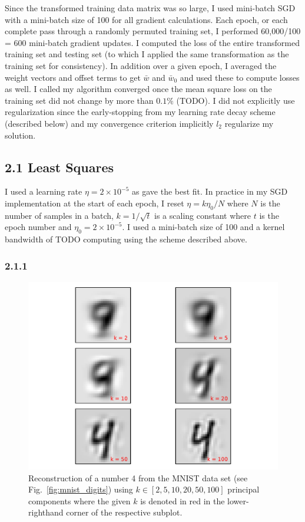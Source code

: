 \documentclass[12pt]{amsart}
\begin{document}
Since the transformed training data matrix was so large, I used mini-batch SGD with a mini-batch size of 100 for all gradient calculations.  Each epoch, or each complete pass through a randomly permuted training set, I performed 60,000/100 = 600 mini-batch gradient updates.  I computed the loss of the entire transformed training set and testing set (to which I applied the same transformation as the training set for consistency).  In addition over a given epoch, I averaged the weight vectors and offset terms to get $\bar{w}$ and $\bar{w}_0$ and used these to compute losses as well.  I called my algorithm converged once the mean square loss on the training set did not change by more than $0.1\%$ (TODO).  I did not explicitly use regularization since the early-stopping from my learning rate decay scheme (described below) and my convergence criterion implicitly $l_2$ regularize my solution.

\subsection*{2.1 Least Squares}

I used a learning rate $\eta = 2 \times 10^{-5}$ as gave the best fit.  In practice in my SGD implementation at the start of each epoch, I reset $\eta = k\eta_0/N$ where $N$ is the number of samples in a batch, $k = 1/\sqrt{t}$ is a scaling constant where $t$ is the epoch number and $\eta_0 = 2 \times 10^{-5}$.  I used a mini-batch size of 100 and a kernel bandwidth of TODO computing using the scheme described above.

\subsubsection*{2.1.1}

\begin{figure}[H]
	\includegraphics[width=\columnwidth]{4_recon_mnist.pdf}
    \caption{Reconstruction of a number 4 from the MNIST data set (see Fig.~\ref{fig:mnist_digits}) using $k \in [2,5,10,20,50,100]$ principal components where the given $k$ is denoted in red in the lower-righthand corner of the respective subplot.}
    \label{fig:recon_4}
\end{figure}
\end{document}
